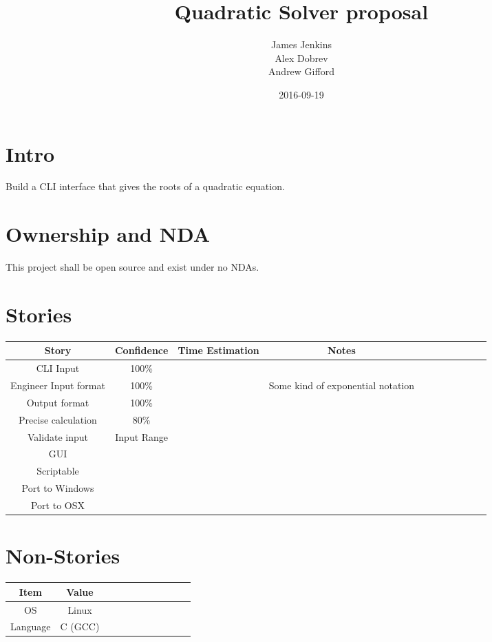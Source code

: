 \documentclass{article}
\title{Quadratic Solver proposal}
\date{2016-09-19}
\author{James Jenkins\\
Alex Dobrev\\
Andrew Gifford}
\begin{document}
    \maketitle
    \newpage

    \section{Intro}
    Build a CLI interface that gives the roots of a quadratic equation.

    \section{Ownership and NDA}
    This project shall be open source and exist under no NDAs.

    \section{Stories}
\begin{tabular}{*{11}{|c}}
    \hline
    Story                 & Confidence & Time Estimation & Notes \\ \hline
    CLI Input             & 100\%      & & \\ \hline
    Engineer Input format & 100\%      & & Some kind of exponential notation \\ \hline
    Output format         & 100\%      & & \\ \hline
    Precise calculation   &  80\%      & & \\
    Validate input        &
    Input Range           &

    \hline
    \\
    \hline

    GUI & & \\ \hline
    Scriptable & & \\ \hline
    Port to Windows & & \\ \hline
    Port to OSX& & \\ \hline

\end{tabular}
    \section{Non-Stories}

\begin{tabular}{*{11}{|c}}
    \hline
    Item       & Value   \\ \hline
    OS         & Linux   \\ \hline
    Language   & C (GCC) \\ \hline
\end{tabular}
\end{document}
